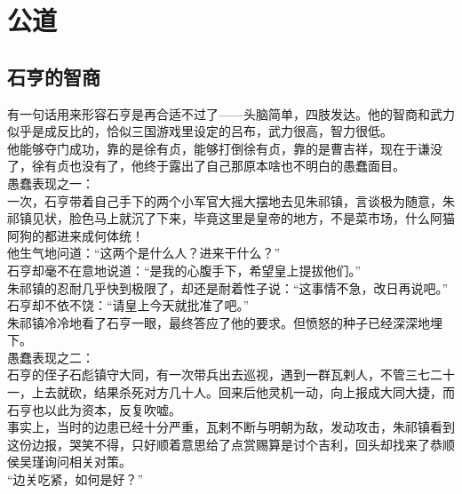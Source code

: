 \section{公道}
\ifnum{}
	\begin{multicols}{\theparacolNo}
\fi
\subsection{石亨的智商}
有一句话用来形容石亨是再合适不过了——头脑简单，四肢发达。他的智商和武力似乎是成反比的，恰似三国游戏里设定的吕布，武力很高，智力很低。\\

他能够夺门成功，靠的是徐有贞，能够打倒徐有贞，靠的是曹吉祥，现在于谦没了，徐有贞也没有了，他终于露出了自己那原本啥也不明白的愚蠢面目。\\

愚蠢表现之一：\\

一次，石亨带着自己手下的两个小军官大摇大摆地去见朱祁镇，言谈极为随意，朱祁镇见状，脸色马上就沉了下来，毕竟这里是皇帝的地方，不是菜市场，什么阿猫阿狗的都进来成何体统！\\

他生气地问道：“这两个是什么人？进来干什么？”\\

石亨却毫不在意地说道：“是我的心腹手下，希望皇上提拔他们。”\\

朱祁镇的忍耐几乎快到极限了，却还是耐着性子说：“这事情不急，改日再说吧。”\\

石亨却不依不饶：“请皇上今天就批准了吧。”\\

朱祁镇冷冷地看了石亨一眼，最终答应了他的要求。但愤怒的种子已经深深地埋下。\\

愚蠢表现之二：\\

石亨的侄子石彪镇守大同，有一次带兵出去巡视，遇到一群瓦剌人，不管三七二十一，上去就砍，结果杀死对方几十人。回来后他灵机一动，向上报成大同大捷，而石亨也以此为资本，反复吹嘘。\\

事实上，当时的边患已经十分严重，瓦剌不断与明朝为敌，发动攻击，朱祁镇看到这份边报，哭笑不得，只好顺着意思给了点赏赐算是讨个吉利，回头却找来了恭顺侯吴瑾询问相关对策。\\

“边关吃紧，如何是好？”\\


\end{multicols}
